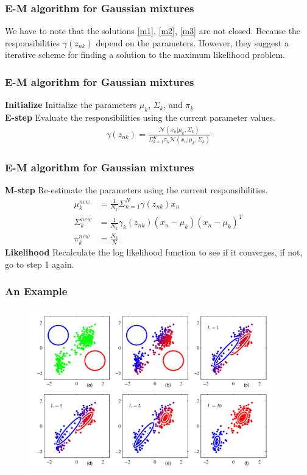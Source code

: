 \documentclass{beamer}
\begin{document}
\begin{frame}
\frametitle{E-M algorithm for Gaussian mixtures}
We have to note that the solutions \ref{m1}, \ref{m2}, \ref{m3} are not closed. Because the responsibilities $\gamma(z_{nk})$ depend on the parameters. However, they suggest a iterative scheme for finding a solution to the maximum likelihood problem. 
\end{frame}
\begin{frame}
\frametitle{E-M algorithm for Gaussian mixtures}

\textbf{Initialize} Initialize the parameters $\mu_k$, $\Sigma_k$, and $\pi_k$\\
\textbf{E-step} Evaluate the responsibilities using the current parameter values.
\begin{equation}
\begin{split}
\gamma (z_{nk}) = \frac{\mathcal{N}(x_n|\mu_k, \Sigma_k)}{\Sigma^K_{k=1}\pi_k\mathcal{N}(x_n|\mu_k,\Sigma_k)}
\end{split}
\end{equation}

\end{frame}

\begin{frame}
\frametitle{E-M algorithm for Gaussian mixtures}
\textbf{M-step} 
Re-estimate the parameters using the current responsibilities.
\begin{equation}
\begin{split}
\mu_k^{new}&=\frac{1}{N_k}{\Sigma^{N}_{n=1}\gamma(z_{nk})x_n}\\
\Sigma_k^{new}&=\frac{1}{N_k}\gamma_k(z_{nk})(x_n-\mu_k)(x_n-\mu_k)^T\\
\pi_k^{new}&=\frac{N_k}{N}
\end{split}
\end{equation}
\textbf{Likelihood} Recalculate the log likelihood function to see if it converges, if not, go to step 1 again.
\end{frame}

\begin{frame}
\frametitle{An Example}
\begin{figure}
\includegraphics[width=300pt]{EM-example.png}
\end{figure}
\end{frame}
\end{document}
